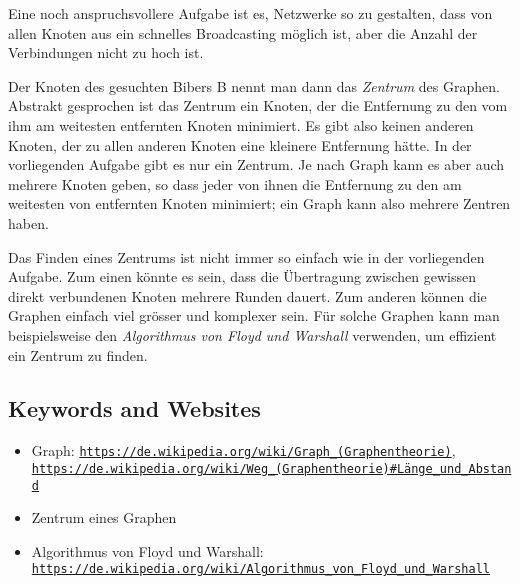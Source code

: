 \documentclass[a4paper,11pt]{report}
\newcommand{\BrochureUrlText}[1]{\texttt{#1}}
\begin{document}
Eine noch anspruchsvollere Aufgabe ist es, Netzwerke so zu gestalten, dass von allen Knoten aus ein schnelles Broadcasting möglich ist, aber die Anzahl der Verbindungen nicht zu hoch ist.

Der Knoten des gesuchten Bibers B nennt man dann das \emph{Zentrum} des Graphen. Abstrakt gesprochen ist das Zentrum ein Knoten, der die Entfernung zu den vom ihm am weitesten entfernten Knoten minimiert. Es gibt also keinen anderen Knoten, der zu allen anderen Knoten eine kleinere Entfernung hätte. In der vorliegenden Aufgabe gibt es nur ein Zentrum. Je nach Graph kann es aber auch mehrere Knoten geben, so dass jeder von ihnen die Entfernung zu den am weitesten von entfernten Knoten minimiert; ein Graph kann also mehrere Zentren haben.

Das Finden eines Zentrums ist nicht immer so einfach wie in der vorliegenden Aufgabe. Zum einen könnte es sein, dass die Übertragung zwischen gewissen direkt verbundenen Knoten mehrere Runden dauert. Zum anderen können die Graphen einfach viel grösser und komplexer sein. Für solche Graphen kann man beispielsweise den \emph{Algorithmus von Floyd und Warshall} verwenden, um effizient ein Zentrum zu finden.

{\raggedright

\subsection*{Keywords and Websites}

\begin{itemize}
  \item Graph: \href{https://de.wikipedia.org/wiki/Graph_(Graphentheorie)}{\BrochureUrlText{https://de.wikipedia.org/wiki/Graph\_(Graphentheorie)}}, \href{https://de.wikipedia.org/wiki/Weg_(Graphentheorie)\#L\%C3\%A4nge_und_Abstand}{\BrochureUrlText{https://de.wikipedia.org/wiki/Weg\_(Graphentheorie)\#Länge\_und\_Abstand}}
  \item Zentrum eines Graphen
  \item Algorithmus von Floyd und Warshall: \href{https://de.wikipedia.org/wiki/Algorithmus_von_Floyd_und_Warshall}{\BrochureUrlText{https://de.wikipedia.org/wiki/Algorithmus\_von\_Floyd\_und\_Warshall}}
\end{itemize}


}
\end{document}
